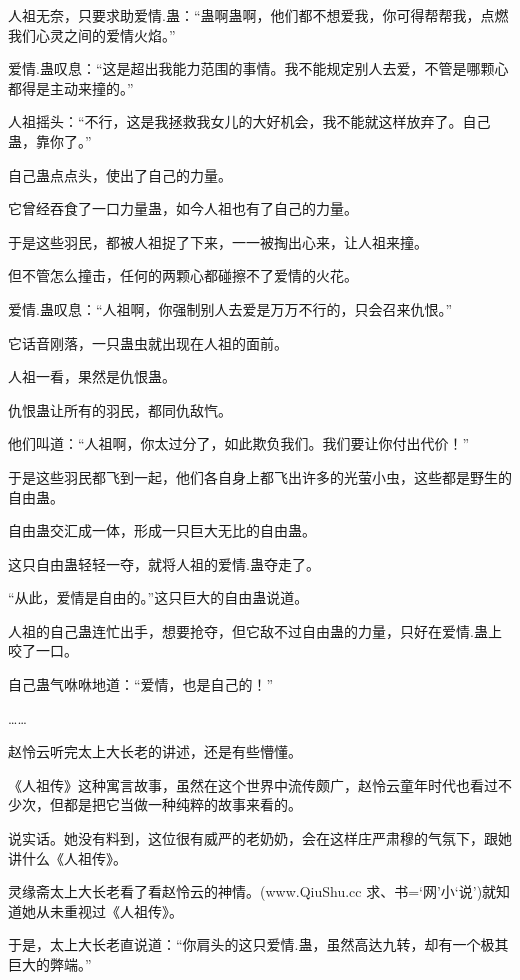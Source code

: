 
\begin{this_body}

人祖无奈，只要求助爱情.蛊：“蛊啊蛊啊，他们都不想爱我，你可得帮帮我，点燃我们心灵之间的爱情火焰。”

爱情.蛊叹息：“这是超出我能力范围的事情。我不能规定别人去爱，不管是哪颗心都得是主动来撞的。”

人祖摇头：“不行，这是我拯救我女儿的大好机会，我不能就这样放弃了。自己蛊，靠你了。”

自己蛊点点头，使出了自己的力量。

它曾经吞食了一口力量蛊，如今人祖也有了自己的力量。

于是这些羽民，都被人祖捉了下来，一一被掏出心来，让人祖来撞。

但不管怎么撞击，任何的两颗心都碰擦不了爱情的火花。

爱情.蛊叹息：“人祖啊，你强制别人去爱是万万不行的，只会召来仇恨。”

它话音刚落，一只蛊虫就出现在人祖的面前。

人祖一看，果然是仇恨蛊。

仇恨蛊让所有的羽民，都同仇敌忾。

他们叫道：“人祖啊，你太过分了，如此欺负我们。我们要让你付出代价！”

于是这些羽民都飞到一起，他们各自身上都飞出许多的光萤小虫，这些都是野生的自由蛊。

自由蛊交汇成一体，形成一只巨大无比的自由蛊。

这只自由蛊轻轻一夺，就将人祖的爱情.蛊夺走了。

“从此，爱情是自由的。”这只巨大的自由蛊说道。

人祖的自己蛊连忙出手，想要抢夺，但它敌不过自由蛊的力量，只好在爱情.蛊上咬了一口。

自己蛊气咻咻地道：“爱情，也是自己的！”

……

赵怜云听完太上大长老的讲述，还是有些懵懂。

《人祖传》这种寓言故事，虽然在这个世界中流传颇广，赵怜云童年时代也看过不少次，但都是把它当做一种纯粹的故事来看的。

说实话。她没有料到，这位很有威严的老奶奶，会在这样庄严肃穆的气氛下，跟她讲什么《人祖传》。

灵缘斋太上大长老看了看赵怜云的神情。(www.QiuShu.cc 求、书=‘网’小‘说’)就知道她从未重视过《人祖传》。

于是，太上大长老直说道：“你肩头的这只爱情.蛊，虽然高达九转，却有一个极其巨大的弊端。”


\end{this_body}
